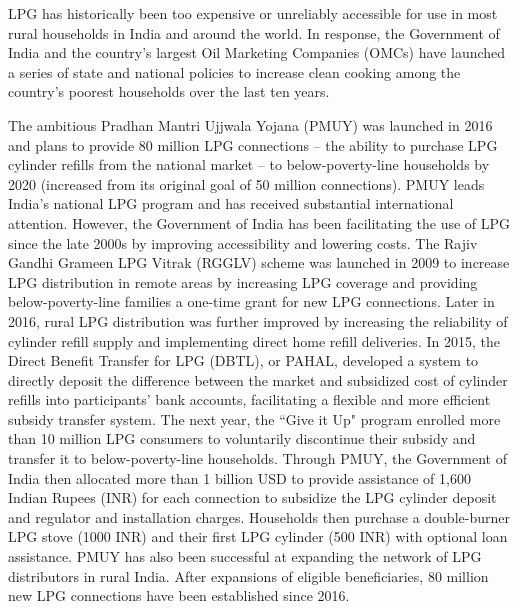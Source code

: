 \documentclass[11pt,english]{article}
\theoremstyle{plain} \newtheorem{claim}{Claim}
\theoremstyle{plain} \newtheorem{prop}{Proposition}
\theoremstyle{plain} \newtheorem{hypo}{Hypothesis}
\begin{document}
LPG has historically been too expensive or unreliably accessible for use in most rural households in India and around the world\citep{Kumar2016,Quinnetal2018}. In response, the Government of India and the country's largest Oil Marketing Companies (OMCs) have launched a series of state and national policies to increase clean cooking among the country's poorest households over the last ten years.

The ambitious Pradhan Mantri Ujjwala Yojana (PMUY) was launched in 2016 and plans to provide 80 million LPG connections -- the ability to purchase LPG cylinder refills from the national market -- to below-poverty-line households by 2020 (increased from its original goal of 50 million connections)\citep{MoPNG2018}. PMUY leads India's national LPG program and has received substantial international attention. However, the Government of India has been facilitating the use of LPG since the late 2000s by improving accessibility and lowering costs. The Rajiv Gandhi Grameen LPG Vitrak (RGGLV) scheme was launched in 2009 to increase LPG distribution in remote areas by increasing LPG coverage and providing below-poverty-line families a one-time grant for new LPG connections. Later in 2016, rural LPG distribution was further improved by increasing the reliability of cylinder refill supply and implementing direct home  refill deliveries. In 2015, the Direct Benefit Transfer for LPG (DBTL), or PAHAL, developed a system to directly deposit the difference between the market and subsidized cost of cylinder refills into participants' bank accounts, facilitating a flexible and more efficient subsidy transfer system\citep{Jainetal2018}. The next year, the ``Give it Up" program enrolled more than 10 million LPG consumers to voluntarily discontinue their subsidy and transfer it to below-poverty-line households. Through PMUY, the Government of India then allocated more than 1 billion USD to provide assistance of 1,600 Indian Rupees (INR) for each connection to subsidize the LPG cylinder deposit and regulator and installation charges. Households then purchase a double-burner LPG stove (1000 INR) and their first LPG cylinder (500 INR) with optional loan assistance. PMUY has also been successful at expanding the network of LPG distributors in rural India. After expansions of eligible beneficiaries, 80 million new LPG connections have been established since 2016\citep{MOPNG2019}. 
\end{document}
